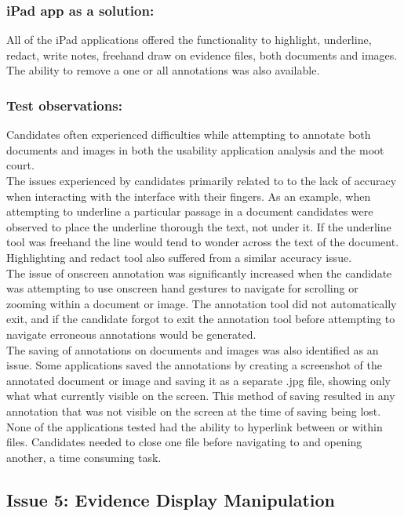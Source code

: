 \documentclass{article}
\begin{document}
\subsubsection{iPad app as a solution:}
All of the iPad applications offered the functionality to highlight, underline, redact, write notes, freehand draw on evidence files, both documents and images. The ability to remove a one or all annotations was also available.
\\
\subsubsection{Test observations:}
Candidates often experienced difficulties while attempting to annotate both documents and images in both the usability application analysis and the moot court.\\
The issues experienced by candidates primarily related to to the lack of accuracy when interacting with the interface with their fingers. As an example, when attempting to underline a particular passage in a document candidates were observed to place the underline thorough the text, not under it. If the underline tool was freehand the line would tend to wonder across the text of the document. Highlighting and redact tool also suffered from a similar accuracy issue.\\
The issue of onscreen annotation was significantly increased when the candidate was attempting to use onscreen hand gestures to navigate for scrolling or zooming within a document or image. The annotation tool did not automatically exit, and if the candidate forgot to exit the annotation tool before attempting to navigate erroneous annotations  would be generated.\\
The saving of annotations on documents and images was also identified as an issue. Some applications saved the annotations by creating a screenshot of the annotated document or image and saving it as a separate .jpg file, showing only what what currently visible on the screen. This method of saving resulted in any annotation that was not visible on the screen at the time of saving being lost.
None of the applications tested had the ability to hyperlink between or within files. Candidates needed to close one file before navigating to and opening another, a time consuming task.


\subsection{Issue 5: Evidence Display Manipulation}
\end{document}
